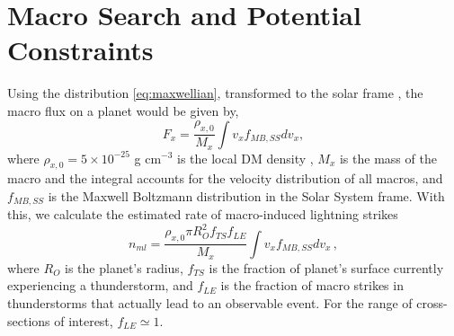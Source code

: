 \documentclass[%
 reprint,
 amsmath,amssymb,
 aps,
]{revtex4-2}
\begin{document}



\section{Macro Search and Potential Constraints}%
\label{sec:macro_search_and_constraints}

    Using the distribution \eqref{eq:maxwellian}, transformed to the solar frame \citep{Freese2013}, the macro flux on a planet would be given by,
    \begin{equation}\label{eq:planet_macro_flux}
        F_{x} = \frac{\rho_{x,0}}{M_{x}} \int v_{x} f_{MB,SS} dv_x,
    \end{equation}
    where $\rho_{x,0} = 5 \times 10^{-25}$ g cm$^{-3}$ is the local DM density \cite{Bovy2012}, $M_{x}$ is the mass of the macro and the integral accounts for the velocity distribution of all macros, and $f_{MB,SS}$ is the Maxwell Boltzmann distribution in the Solar System frame. With this, we calculate the estimated rate of macro-induced lightning strikes
    \begin{equation}\label{eq:macro_lightning_rate}
        n_{ml} = \frac{\rho_{x,0} \pi R_{O}^2 f_{TS} f_{LE}}{M_{x}}\int v_{x} f_{MB,SS} dv_x\,,
    \end{equation}
    where $R_{O}$ is the planet's radius, $f_{TS}$ is the fraction of planet's surface currently experiencing a thunderstorm, and $f_{LE}$ is the fraction of macro strikes in thunderstorms that actually lead to an observable event. For the range of cross-sections of interest, $f_{LE}\simeq1$.
\end{document}
